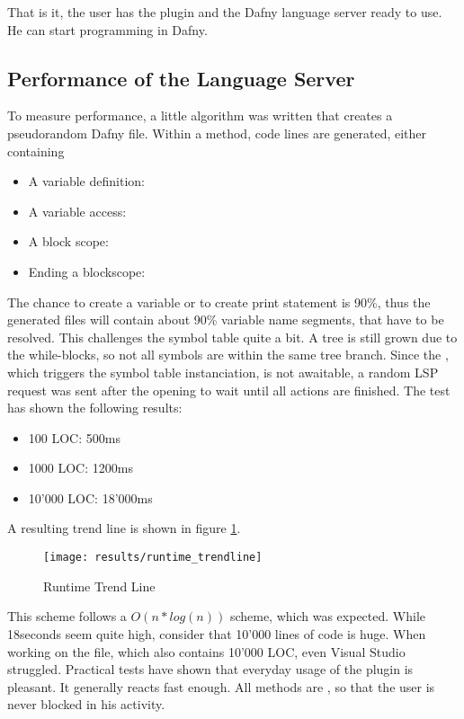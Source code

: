 That is it, the user has the plugin and the Dafny language server ready to use.
He can start programming in Dafny.

\subsection{Performance of the Language Server}
To measure performance, a little algorithm was written that creates a pseudorandom Dafny file.
Within a method, code lines are generated, either containing
\begin{itemize}
    \item A variable definition: 
    \item A variable access: 
    \item A block scope: 
    \item Ending a blockscope: \code{\}}
\end{itemize}
The chance to create a variable or to create print statement is 90\%, thus the generated files will contain about 90\% variable name segments, that have to be resolved.
This challenges the symbol table quite a bit.
A tree is still grown due to the while-blocks, so not all symbols are within the same tree branch.
Since the , which triggers the symbol table instanciation, is not awaitable, a random LSP request was sent after the opening to wait until all actions are finished.
The test has shown the following results:

\begin{itemize}
    \item 100 LOC: 500ms
    \item 1000 LOC: 1200ms
    \item 10'000 LOC: 18'000ms
\end{itemize}

A resulting trend line is shown in figure \ref{fig:trendline_1}.

\begin{figure}[H]
    \centering
    \texttt{[image: results/runtime\_trendline]}
    \caption{Runtime Trend Line}
    \label{fig:trendline_1}
\end{figure}

This scheme follows a $O(n*log(n))$ scheme, which was expected.
While 18seconds seem quite high, consider that 10'000 lines of code is huge.
When working on the  file, which also contains 10'000 LOC, even Visual Studio struggled.
Practical tests have shown that everyday usage of the plugin is pleasant.
It generally reacts fast enough.
All methods are , so that the user is never blocked in his activity.

